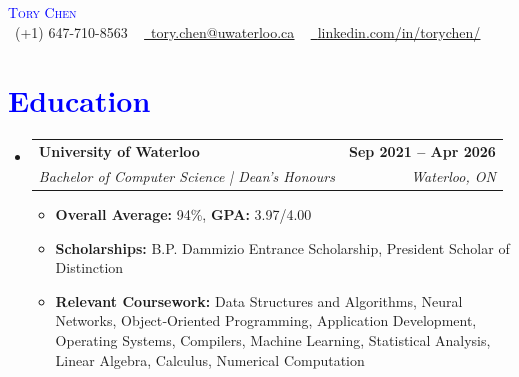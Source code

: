 \documentclass[letterpaper,11pt]{article}
\makeatletter
\newcommand{\resumeItem}[1]{
  \item\small{
    {#1 \vspace{-3pt}}
  }
}
\newcommand{\resumeSubheading}[4]{
  \vspace{-2pt}\item
    \begin{tabular*}{1.0\textwidth}[t]{l@{\extracolsep{\fill}}r}
      \textbf{#1} & \textbf{\small #2} \\
      \textit{\small#3} & \textit{\small #4} \\
    \end{tabular*}\vspace{-7pt}
}
\newcommand{\resumeSubHeadingListStart}{\begin{itemize}[leftmargin=0.0in, label={}]}
\newcommand{\resumeSubHeadingListEnd}{\end{itemize}}
\newcommand{\resumeItemListStart}{\begin{itemize}[leftmargin=0.2in]}
\newcommand{\resumeItemListEnd}{\end{itemize}\vspace{-5pt}}
\makeatother
\begin{document}
\begin{center}
    \textcolor{Blue}{\Huge \scshape Tory Chen} \\ \vspace{1pt}
    \small \raisebox{-0.1\height}\faPhone\ (+1) 647-710-8563 ~ \href{mailto:tory.chen@uwaterloo.ca}{\raisebox{-0.2\height}\faEnvelope\  \underline{tory.chen@uwaterloo.ca}} ~ 
    \href{https://www.linkedin.com/in/torychen/}{\raisebox{-0.2\height}\faLinkedin\ \underline{linkedin.com/in/torychen/}}  ~
    \vspace{-8pt}
\end{center}


\section{\textcolor{Blue}{Education}}
  \resumeSubHeadingListStart
    \resumeSubheading
          {\textcolor{NavyBlue}{University of Waterloo}}{Sep 2021 -- Apr 2026}
      {Bachelor of Computer Science | Dean's Honours}{Waterloo, ON}
      \resumeItemListStart
        \resumeItem{\textbf{\textcolor{NavyBlue}{Overall Average:}} 94\%, \textbf{\textcolor{NavyBlue}{GPA:}} 3.97/4.00}
        \resumeItem{\textbf{\textcolor{NavyBlue}{Scholarships:}} B.P. Dammizio Entrance Scholarship, President Scholar of Distinction}
        \resumeItem{\textbf{\textcolor{NavyBlue}{Relevant Coursework:}} Data Structures and Algorithms, Neural Networks, Object‐Oriented Programming, Application Development, Operating Systems, Compilers, Machine Learning, Statistical Analysis, Linear Algebra, Calculus, Numerical Computation}
      \resumeItemListEnd 
  \resumeSubHeadingListEnd
\vspace{-15pt}
\end{document}
